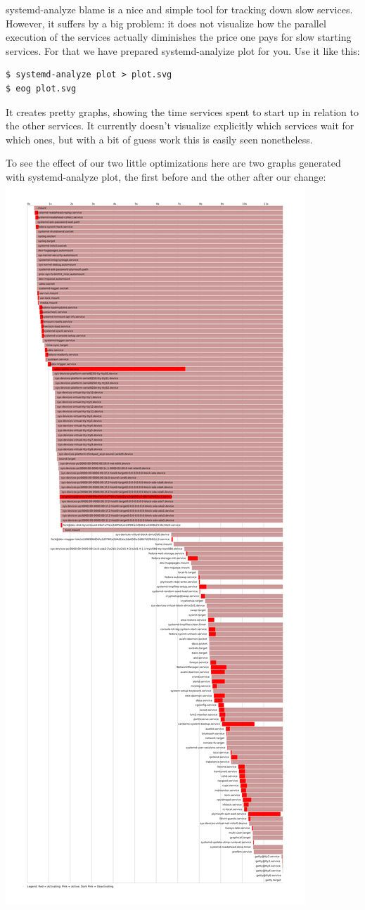 \documentclass[titlepage]{article}
\begin{document}
systemd-analyze blame is a nice and simple tool for tracking down slow services. However, it suffers by a big problem: it does not visualize how the parallel execution of the services actually diminishes the price one pays for slow starting services. For that we have prepared systemd-analyize plot for you. Use it like this:
\begin{lstlisting}
$ systemd-analyze plot > plot.svg
$ eog plot.svg
\end{lstlisting}
It creates pretty graphs, showing the time services spent to start up in relation to the other services. It currently doesn't visualize explicitly which services wait for which ones, but with a bit of guess work this is easily seen nonetheless.

To see the effect of our two little optimizations here are two graphs generated with systemd-analyze plot, the first before and the other after our change:
\includegraphics[scale=0.1]{blame.png}
\end{document}
